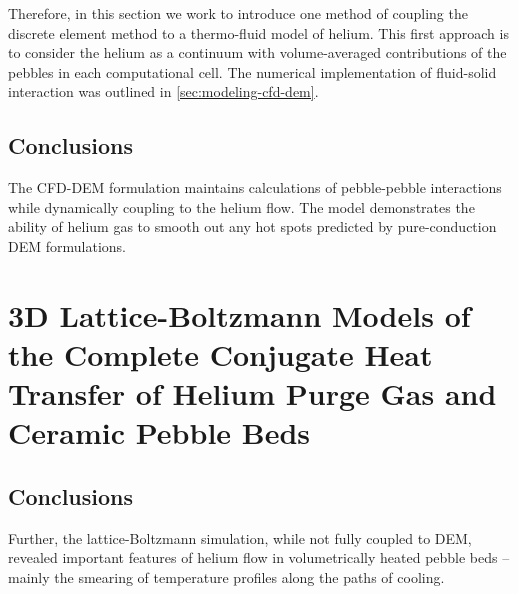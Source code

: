Therefore, in this section we work to introduce one method of coupling the discrete element method to a thermo-fluid model of helium. This first approach is to consider the helium as a continuum with volume-averaged contributions of the pebbles in each computational cell. The numerical implementation of fluid-solid interaction was outlined in \cref{sec:modeling-cfd-dem}.





\subsection{Conclusions}
The CFD-DEM formulation maintains calculations of pebble-pebble interactions while dynamically coupling to the helium flow. The model demonstrates the ability of helium gas to smooth out any hot spots predicted by pure-conduction DEM formulations. 










\section{3D Lattice-Boltzmann Models of the Complete Conjugate Heat Transfer of Helium Purge Gas and Ceramic Pebble Beds}\label{sec:lbm-studies}



\subsection{Conclusions}
Further, the lattice-Boltzmann simulation, while not fully coupled to DEM, revealed important features of helium flow in volumetrically heated pebble beds -- mainly the smearing of temperature profiles along the paths of cooling.









